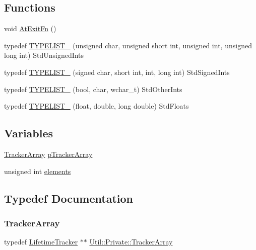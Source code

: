 \subsection*{Functions}
\begin{DoxyCompactItemize}
\item 
void \mbox{\hyperlink{namespaceUtil_1_1Private_a98e2ffcf46d002cf16c15c8ab26e7818}{At\+Exit\+Fn}} ()
\item 
typedef \mbox{\hyperlink{namespaceUtil_1_1Private_aa81b02b7963e37c42096312fa70d0791}{T\+Y\+P\+E\+L\+I\+S\+T\+\_}} (unsigned char, unsigned short int, unsigned int, unsigned long int) Std\+Unsigned\+Ints
\item 
typedef \mbox{\hyperlink{namespaceUtil_1_1Private_a19b1c2e5f4b1c1a580f117d4ca819b3e}{T\+Y\+P\+E\+L\+I\+S\+T\+\_}} (signed char, short int, int, long int) Std\+Signed\+Ints
\item 
typedef \mbox{\hyperlink{namespaceUtil_1_1Private_a3b8821ccc8b156ae11dc2d5852d47af0}{T\+Y\+P\+E\+L\+I\+S\+T\+\_}} (bool, char, wchar\+\_\+t) Std\+Other\+Ints
\item 
typedef \mbox{\hyperlink{namespaceUtil_1_1Private_a0b98bef9e8fd094726b49ae3ea04d81d}{T\+Y\+P\+E\+L\+I\+S\+T\+\_}} (float, double, long double) Std\+Floats
\end{DoxyCompactItemize}
\subsection*{Variables}
\begin{DoxyCompactItemize}
\item 
\mbox{\hyperlink{namespaceUtil_1_1Private_a51d35478cde8e0af0d19ef32c88bf016}{Tracker\+Array}} \mbox{\hyperlink{namespaceUtil_1_1Private_ac1d3e8d33803518de43c86a09b4b2566}{p\+Tracker\+Array}}
\item 
unsigned int \mbox{\hyperlink{namespaceUtil_1_1Private_a03bf7a9b9a2685506d33cfdcb748f444}{elements}}
\end{DoxyCompactItemize}


\subsection{Typedef Documentation}
\mbox{\label{namespaceUtil_1_1Private_a51d35478cde8e0af0d19ef32c88bf016}} 
\subsubsection{\texorpdfstring{TrackerArray}{TrackerArray}}
{\footnotesize\ttfamily typedef \mbox{\hyperlink{classUtil_1_1Private_1_1LifetimeTracker}{Lifetime\+Tracker}} $\ast$$\ast$ \mbox{\hyperlink{namespaceUtil_1_1Private_a51d35478cde8e0af0d19ef32c88bf016}{Util\+::\+Private\+::\+Tracker\+Array}}}



